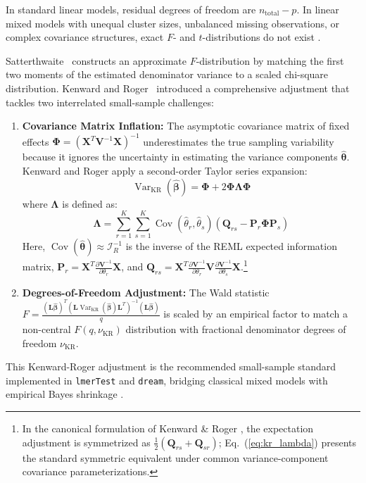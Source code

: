 \documentclass[11pt,twoside,openright]{book}
\begin{document}
In standard linear models, residual degrees of freedom are $n_{\text{total}} - p$. In linear mixed models with unequal cluster sizes, unbalanced missing observations, or complex covariance structures, exact $F$- and $t$-distributions do not exist \cite{kuznetsova2017lmertest}. 

Satterthwaite~\cite{satterthwaite1946approximate} constructs an approximate $F$-distribution by matching the first two moments of the estimated denominator variance to a scaled chi-square distribution. Kenward and Roger~\cite{kenward1997small} introduced a comprehensive adjustment that tackles two interrelated small-sample challenges:
\begin{enumerate}
    \item \textbf{Covariance Matrix Inflation:} The asymptotic covariance matrix of fixed effects $\boldsymbol{\Phi} = (\mathbf{X}^T \mathbf{V}^{-1} \mathbf{X})^{-1}$ underestimates the true sampling variability because it ignores the uncertainty in estimating the variance components $\hat{\boldsymbol{\theta}}$. Kenward and Roger apply a second-order Taylor series expansion:
    \begin{equation}
    \label{eq:kr_cov}
    \operatorname{Var}_{\text{KR}}(\hat{\boldsymbol{\beta}}) = \boldsymbol{\Phi} + 2 \boldsymbol{\Phi} \boldsymbol{\Lambda} \boldsymbol{\Phi}
    \end{equation}
    where $\boldsymbol{\Lambda}$ is defined as:
    \begin{equation}
    \label{eq:kr_lambda}
    \boldsymbol{\Lambda} = \sum_{r=1}^K \sum_{s=1}^K \operatorname{Cov}(\hat{\theta}_r, \hat{\theta}_s) \left( \mathbf{Q}_{rs} - \mathbf{P}_r \boldsymbol{\Phi} \mathbf{P}_s \right)
    \end{equation}
    Here, $\operatorname{Cov}(\hat{\boldsymbol{\theta}}) \approx \mathcal{I}_R^{-1}$ is the inverse of the REML expected information matrix, $\mathbf{P}_r = \mathbf{X}^T \frac{\partial \mathbf{V}^{-1}}{\partial \theta_r} \mathbf{X}$, and $\mathbf{Q}_{rs} = \mathbf{X}^T \frac{\partial \mathbf{V}^{-1}}{\partial \theta_r} \mathbf{V} \frac{\partial \mathbf{V}^{-1}}{\partial \theta_s} \mathbf{X}$.\footnote{In the canonical formulation of Kenward \& Roger \cite{kenward1997small}, the expectation adjustment is symmetrized as $\frac{1}{2}(\mathbf{Q}_{rs} + \mathbf{Q}_{sr})$; Eq.~(\ref{eq:kr_lambda}) presents the standard symmetric equivalent under common variance-component covariance parameterizations.}
    \item \textbf{Degrees-of-Freedom Adjustment:} The Wald statistic $F = \frac{(\mathbf{L}\hat{\boldsymbol{\beta}})^T (\mathbf{L} \operatorname{Var}_{\text{KR}}(\hat{\boldsymbol{\beta}}) \mathbf{L}^T)^{-1} (\mathbf{L}\hat{\boldsymbol{\beta}})}{q}$ is scaled by an empirical factor to match a non-central $F(q, \nu_{\text{KR}})$ distribution with fractional denominator degrees of freedom $\nu_{\text{KR}}$.
\end{enumerate}
This Kenward-Roger adjustment is the recommended small-sample standard implemented in \texttt{lmerTest} and \texttt{dream}, bridging classical mixed models with empirical Bayes shrinkage \cite{smyth2004linear, ritchie2015limma, hoffman2021dream, kuznetsova2017lmertest}.
\end{document}
